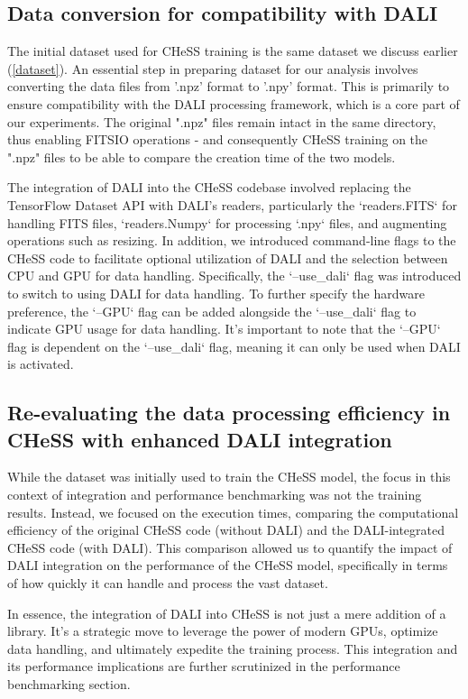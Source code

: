 \documentclass[licencjacka,en]{pracamgr}
\begin{document}
\subsection{Data conversion for compatibility with DALI}
The initial dataset used for CHeSS training is the same dataset we discuss earlier (\ref{dataset}). An essential step in preparing dataset for our analysis involves converting the data \cite{sdo} files from '.npz' format to '.npy' format. This is primarily to ensure compatibility with the DALI processing framework, which is a core part of our experiments. The original ".npz" files remain intact in the same directory, thus enabling FITSIO operations - and consequently CHeSS training on the ".npz" files to be able to compare the creation time of the two models.

The integration of DALI into the CHeSS codebase involved replacing the TensorFlow Dataset API with DALI's readers, particularly the `readers.FITS` for handling FITS files, `readers.Numpy` for processing `.npy` files, and augmenting operations such as resizing. In addition, we introduced command-line flags to the CHeSS code to facilitate optional utilization of DALI and the selection between CPU and GPU for data handling. Specifically, the `--use\_dali` flag was introduced to switch to using DALI for data handling. To further specify the hardware preference, the `--GPU` flag can be added alongside the `--use\_dali` flag to indicate GPU usage for data handling. It's important to note that the `--GPU` flag is dependent on the `--use\_dali` flag, meaning it can only be used when DALI is activated.

\subsection{Re-evaluating the data processing efficiency in CHeSS with enhanced DALI integration}
While the dataset was initially used to train the CHeSS model, the focus in this context of integration and performance benchmarking was not the training results. Instead, we focused on the execution times, comparing the computational efficiency of the original CHeSS code (without DALI) and the DALI-integrated CHeSS code (with DALI). This comparison allowed us to quantify the impact of DALI integration on the performance of the CHeSS model, specifically in terms of how quickly it can handle and process the vast dataset.

In essence, the integration of DALI into CHeSS is not just a mere addition of a library. It's a strategic move to leverage the power of modern GPUs, optimize data handling, and ultimately expedite the training process. This integration and its performance implications are further scrutinized in the performance benchmarking section.
\end{document}
